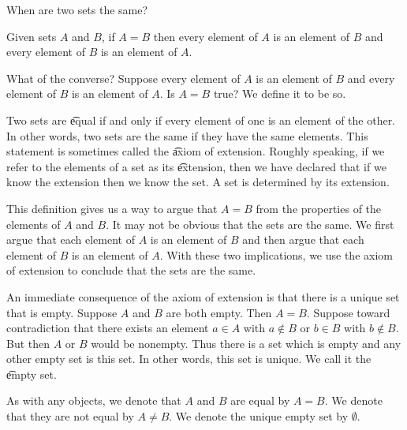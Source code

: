 

When are two sets the same?


Given sets $A$ and $B$, if $A = B$ then every element of $A$ is an element of $B$ and every element of $B$ is an element of $A$.

\begin{account}[Test]
\have{}{set_equality:test:firstin}{$x \in B$}{by 
\have{identity:test:firstin}{$(\forall x)(x \in A \implies x \in B)$}
\end{account}


What of the converse?
Suppose every element of $A$ is an element of $B$ and every element of $B$ is an element of $A$.
Is $A = B$ true?
We define it to be so.

Two sets are \t{equal} if and only if every element of one is an element of the other.
In other words, two sets are the same if they have the same elements.
This statement is sometimes called the \t{axiom of extension}.
Roughly speaking, if we refer to the elements of a set as its \t{extension}, then we have declared that if we know the extension then we know the set.
A set is determined by its extension.

This definition gives us a way to argue that $A = B$ from the properties of the elements of $A$ and $B$.
It may not be obvious that the sets are the same.
We first argue that each element of $A$ is an element of $B$ and then argue that each element of $B$ is an element of $A$.
With these two implications, we use the axiom of extension to conclude that the sets are the same.

An immediate consequence of the axiom of extension is that there is a unique set that is empty.
Suppose $A$ and $B$ are both empty.
Then $A = B$.
Suppose toward contradiction that there exists an element $a \in A$ with $a \not\in B$ or $b \in B$ with $b \not\in B$.
But then $A$ or $B$ would be nonempty.
Thus there is a set which is empty and any other empty set is this set.
In other words, this set is unique.
We call it the \t{empty set}.


As with any objects, we denote that $A$ and $B$ are equal
by $A = B$.
We denote that they are not equal by $A \neq B$.
We denote the unique empty set by $\emptyset$.


